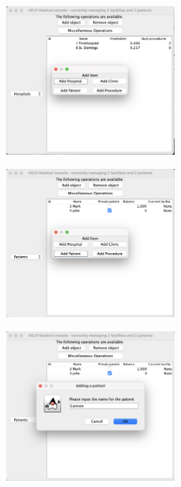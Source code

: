\documentclass{article}
\begin{document}
\begin{figure}
  \begin{center}
    \includegraphics[width=0.5\textwidth]{./figures/Add/Hospital_3.png}
  \end{center}
\end{figure}

\begin{figure}
  \begin{center}
    \includegraphics[width=0.5\textwidth]{./figures/Add/Patient_1.png}
  \end{center}
\end{figure}

\begin{figure}
  \begin{center}
    \includegraphics[width=0.5\textwidth]{./figures/Add/Patient_2.png}
  \end{center}
\end{figure}
\end{document}
